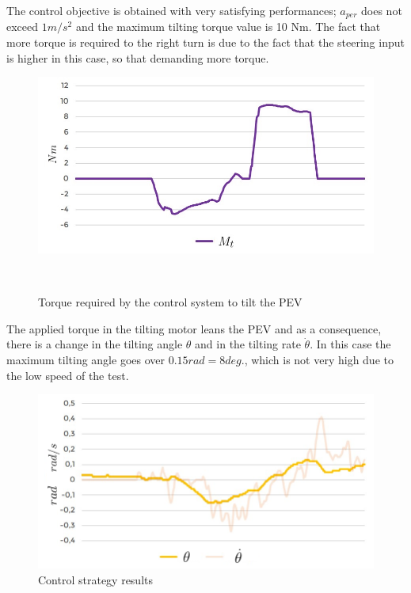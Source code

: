 The control objective is obtained with very satisfying performances; $a_{per}$ does not exceed $1m/s^2$ and the maximum tilting torque value is 10 Nm. The fact that more torque is required to the right turn is due to the fact that the steering input is higher in this case, so that demanding more torque.
\begin{figure}[!h]
	\includegraphics[width=1\linewidth]{figs/06/tests/Picture4b}
	\caption{Torque required by the control system to tilt the PEV}
	\label{Picture4}
	\\[-3cm]
\end{figure}

\newpage
The applied torque in the tilting motor leans the PEV and as a consequence, there is a change in the tilting angle $\theta$ and in the tilting rate $\dot{\theta}$. In this case the maximum tilting angle goes over $0.15 rad=8 deg.$, which is not very high due to the low speed of the test.
 
\begin{figure}[!h]
	\includegraphics[width=1\linewidth]{figs/06/tests/Picture3b}
	\caption{Control strategy results}
	\label{Picture3}
\end{figure}


